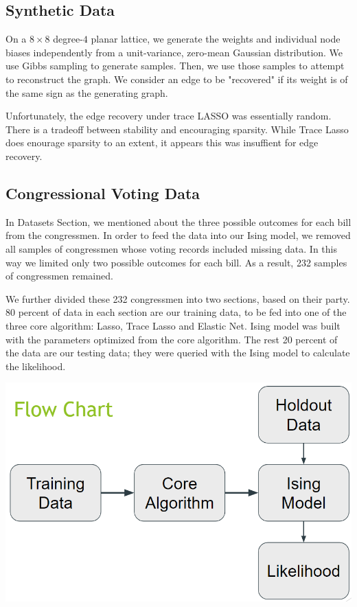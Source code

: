 \documentclass[11pt]{article}
\begin{document}
\subsection{Synthetic Data}
On a $8\times8$ degree-$4$ planar lattice, we generate the weights and individual node biases independently from a unit-variance, zero-mean Gaussian distribution.
We use Gibbs sampling to generate samples.
Then, we use those samples to attempt to reconstruct the graph. We consider an edge to be "recovered" if its weight is of the same sign as the generating graph.

Unfortunately, the edge recovery under trace LASSO was essentially random. There is a tradeoff between stability and encouraging sparsity. While Trace Lasso does enourage sparsity to an extent, it appears this was insuffient for edge recovery.
  
\subsection{Congressional Voting Data}

In Datasets Section, we mentioned about the three possible outcomes for each bill from the congressmen. In order to feed the data into our Ising model, we removed all samples of congressmen whose voting records included missing data. In this way we limited only two possible outcomes for each bill. As a result,  232 samples of congressmen remained. 

We further divided these 232 congressmen into two sections, based on their party. 80 percent of data in each section are our training data, to be fed into one of the three core algorithm: Lasso, Trace Lasso and Elastic Net. Ising model was built with the parameters optimized from the core algorithm. The rest 20 percent of the data are our testing data; they were queried with the Ising model to calculate the likelihood. 

\includegraphics[scale=0.5]{Control_Flow}
\end{document}
